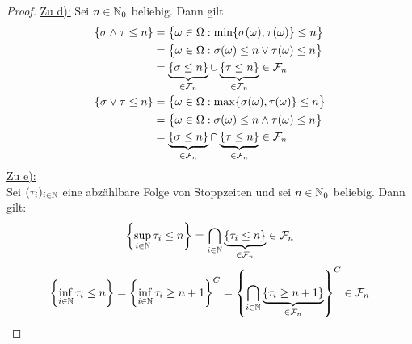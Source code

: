 \documentclass[12pt,a4paper]{article}
\begin{document}
\begin{proof}

\underline{Zu d):} Sei $n\in\mathbb{N}_0$ beliebig. Dann gilt
\begin{align*}
\{\sigma \wedge \tau \leq n \}
&=\big\lbrace\omega\in\Omega:\min\lbrace\sigma(\omega),\tau(\omega)\rbrace\leq n\big\rbrace\\
&=\big\lbrace\omega\in\Omega:\sigma(\omega)\leq n\vee\tau(\omega)\leq n\big\rbrace\\
&=\underbrace{\{\sigma \leq n\}}_{\in \mathcal{F}_n} \cup \underbrace{\{\tau \leq n\}}_{\in\mathcal{F}_n} \in \mathcal{F}_n \\
\{\sigma \vee \tau \leq n \}
&=\big\lbrace\omega\in\Omega:\max\lbrace\sigma(\omega),\tau(\omega)\rbrace\leq n\big\rbrace\\
&=\big\lbrace\omega\in\Omega:\sigma(\omega)\leq n\wedge\tau(\omega)\leq n\big\rbrace\\
&=\underbrace{\{\sigma \leq n\}}_{\in \mathcal{F}_n} \cap \underbrace{\{\tau \leq n\}}_{\in\mathcal{F}_n} \in \mathcal{F}_n \\
\end{align*}
\underline{Zu e):}\\
Sei $(\tau_i)_{i\in\mathbb{N}}$ eine abzählbare Folge von Stoppzeiten und sei $n\in\mathbb{N}_0$ beliebig. Dann gilt:
\begin{align*}
\left\lbrace\sup_{i\in\mathbb{N}} \tau_{i} \leq n\right\rbrace
= \bigcap_{i\in\mathbb{N}}\underbrace{\{\tau_i \leq n\}}_{\in\mathcal{F}_n} \in \mathcal{F}_n
\end{align*}
\begin{align*}
\left\lbrace\inf_{i\in\mathbb{N}} \tau_{i} \leq n\right\rbrace =
\left\lbrace\inf_{i\in\mathbb{N}} \tau_{i} \geq n+1\right\rbrace^C = \left\lbrace\bigcap_{i\in\mathbb{N}}\underbrace{\{\tau_i \geq n+1\}}_{\in\mathcal{F}_n}\right\rbrace^C \in \mathcal{F}_n
\end{align*}

\end{proof}
\end{document}
